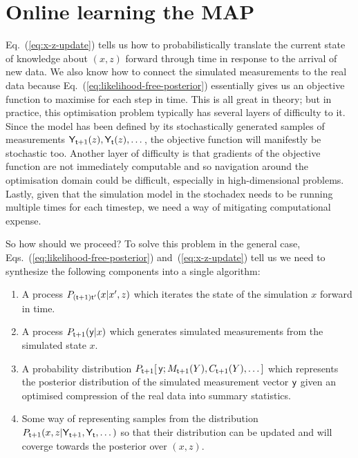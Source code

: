 \section{\sffamily Online learning the MAP}

Eq.~(\ref{eq:x-z-update}) tells us how to probabilistically translate the current state of knowledge about $(x,z)$ forward through time in response to the arrival of new data. We also know how to connect the simulated measurements to the real data because Eq.~(\ref{eq:likelihood-free-posterior}) essentially gives us an objective function to maximise for each step in time. This is all great in theory; but in practice, this optimisation problem typically has several layers of difficulty to it. Since the model has been defined by its stochastically generated samples of measurements ${\sf Y}_{{\sf t}+1}(z), {\sf Y}_{{\sf t}}(z), \dots$, the objective function will manifestly be stochastic too. Another layer of difficulty is that gradients of the objective function are not immediately computable and so navigation around the optimisation domain could be difficult, especially in high-dimensional problems. Lastly, given that the simulation model in the stochadex needs to be running multiple times for each timestep, we need a way of mitigating computational expense. 

So how should we proceed? To solve this problem in the general case, Eqs.~(\ref{eq:likelihood-free-posterior}) and~(\ref{eq:x-z-update}) tell us we need to synthesize the following components into a single algorithm:
\begin{enumerate}
\item{A process $P_{({\sf t}+1){\sf t}'}(x\vert x', z)$ which iterates the state of the simulation $x$ forward in time.}
\item{A process $P_{{\sf t}+1}({\sf y}\vert x)$ which generates simulated measurements from the simulated state $x$.}
\item{A probability distribution $P_{{\sf t}+1}[\,{\sf y};M_{{\sf t}+1}(Y),C_{{\sf t}+1}(Y), \dots ]$ which represents the posterior distribution of the simulated measurement vector ${\sf y}$ given an optimised compression of the real data into summary statistics.}
\item{Some way of representing samples from the distribution $P_{{\sf t}+1}(x,z\vert {\sf Y}_{{\sf t}+1}, {\sf Y}_{{\sf t}}, \dots )$ so that their distribution can be updated and will coverge towards the posterior over $(x,z)$.}
\end{enumerate}

